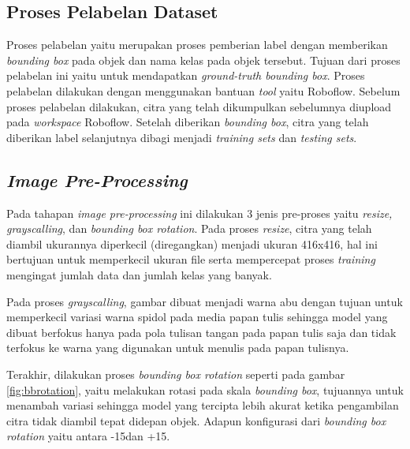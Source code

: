 \subsection{Proses Pelabelan Dataset}
\label{subsec:proseslabelling}

Proses pelabelan yaitu merupakan proses pemberian label dengan memberikan \textit{bounding box} pada objek dan nama kelas pada objek tersebut. Tujuan dari proses pelabelan ini yaitu untuk mendapatkan \textit{ground-truth bounding box}. Proses pelabelan dilakukan dengan menggunakan bantuan \textit{tool} yaitu Roboflow. Sebelum proses pelabelan dilakukan, citra yang telah dikumpulkan sebelumnya diupload pada \textit{workspace} Roboflow. Setelah diberikan \textit{bounding box}, citra yang telah diberikan label selanjutnya dibagi menjadi \textit{training sets} dan \textit{testing sets}. \par

\subsection{\textit{Image Pre-Processing}}
\label{subsec:imagepreprocess}

Pada tahapan \textit{image pre-processing} ini dilakukan 3 jenis pre-proses yaitu \textit{resize, grayscalling}, dan \textit{bounding box rotation}. Pada proses \textit{resize}, citra yang telah diambil ukurannya diperkecil (diregangkan) menjadi ukuran 416x416, hal ini bertujuan untuk memperkecil ukuran file serta mempercepat proses \textit{training} mengingat jumlah data dan jumlah kelas yang banyak. \par

Pada proses \textit{grayscalling}, gambar dibuat menjadi warna abu dengan tujuan untuk memperkecil variasi warna spidol pada media papan tulis sehingga model yang dibuat berfokus hanya pada pola tulisan tangan pada papan tulis saja dan tidak terfokus ke warna yang digunakan untuk menulis pada papan tulisnya. \par

Terakhir, dilakukan proses \textit{bounding box rotation} seperti pada gambar \ref*{fig:bbrotation}, yaitu melakukan rotasi pada skala \textit{bounding box}, tujuannya untuk menambah variasi sehingga model yang tercipta lebih akurat ketika pengambilan citra tidak diambil tepat didepan objek. Adapun konfigurasi dari \textit{bounding box rotation} yaitu antara -15\textdegree\space dan +15\textdegree. \par

